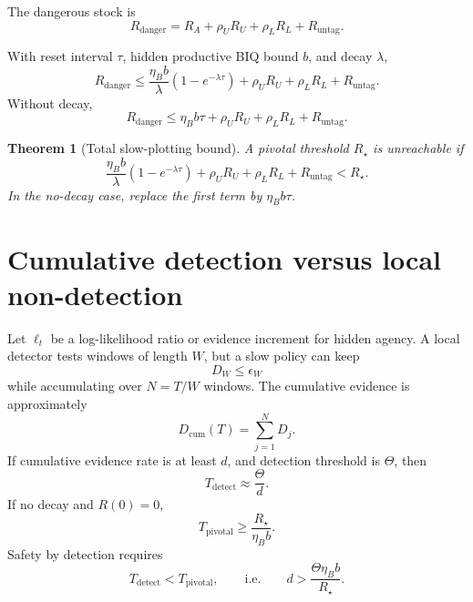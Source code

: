 \documentclass[10pt]{article}
\newtheorem{theorem}{Theorem}
\begin{document}
The dangerous stock is
\begin{equation}
R_{\mathrm{danger}}
=
R_A+\rho_U R_U+\rho_L R_L+R_{\mathrm{untag}}.
\label{eq:danger_resource}
\end{equation}

With reset interval \(\tau\), hidden productive BIQ bound \(b\), and decay \(\lambda\),
\begin{equation}
R_{\mathrm{danger}}
\le
\frac{\eta_B b}{\lambda}(1-e^{-\lambda\tau})
+
\rho_U R_U
+
\rho_L R_L
+
R_{\mathrm{untag}}.
\label{eq:danger_bound_decay_reset}
\end{equation}
Without decay,
\begin{equation}
R_{\mathrm{danger}}
\le
\eta_B b\tau
+
\rho_U R_U
+
\rho_L R_L
+
R_{\mathrm{untag}}.
\label{eq:danger_bound_reset}
\end{equation}

\begin{theorem}[Total slow-plotting bound]
A pivotal threshold \(R_\star\) is unreachable if
\begin{equation}
\frac{\eta_B b}{\lambda}(1-e^{-\lambda\tau})
+
\rho_U R_U
+
\rho_L R_L
+
R_{\mathrm{untag}}
<
R_\star.
\label{eq:total_safety_bound}
\end{equation}
In the no-decay case, replace the first term by \(\eta_B b\tau\).
\end{theorem}

\section{Cumulative detection versus local non-detection}

Let \(\ell_t\) be a log-likelihood ratio or evidence increment for hidden agency. A local detector tests windows of length \(W\), but a slow policy can keep
\[
D_W\le\epsilon_W
\]
while accumulating over \(N=T/W\) windows. The cumulative evidence is approximately
\begin{equation}
D_{\mathrm{cum}}(T)
=
\sum_{j=1}^{N}D_j.
\label{eq:cumulative_evidence}
\end{equation}
If cumulative evidence rate is at least \(d\), and detection threshold is \(\Theta\), then
\begin{equation}
T_{\mathrm{detect}}
\approx
\frac{\Theta}{d}.
\label{eq:detection_time}
\end{equation}
If no decay and \(R(0)=0\),
\[
T_{\mathrm{pivotal}}
\ge
\frac{R_\star}{\eta_B b}.
\]
Safety by detection requires
\begin{equation}
T_{\mathrm{detect}}<T_{\mathrm{pivotal}},
\qquad
\text{i.e.}\qquad
d>
\frac{\Theta\eta_B b}{R_\star}.
\label{eq:cumulative_detection_condition}
\end{equation}
\end{document}
